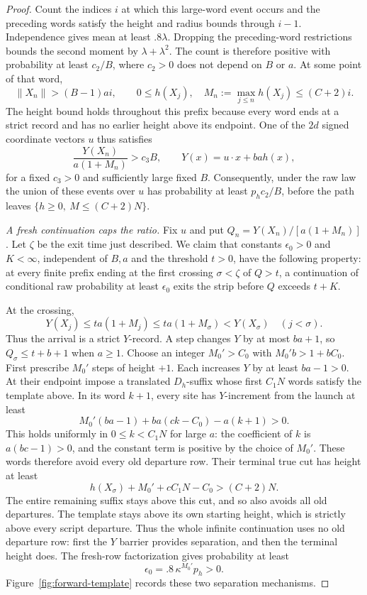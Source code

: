 \begin{proof}
Count the indices $i$ at which this large-word event occurs and the
preceding words satisfy the height and radius bounds through $i-1$.
Independence gives mean at least $.8\lambda$. Dropping the
preceding-word restrictions bounds the second moment by
$\lambda+\lambda^2$. The count is therefore positive with probability
at least $c_2/B$, where $c_2>0$ does not depend on $B$ or $a$.
At some point of that word,
\[
\|X_n\|>(B-1)ai,
\qquad 0\le h(X_j),\quad
M_n:=\max_{j\le n}h(X_j)\le(C+2)i.
\]
The height bound holds throughout this prefix because every word ends
at a strict record and has no earlier height above its endpoint.
One of the $2d$ signed coordinate vectors $u$ thus satisfies
\[
\frac{Y(X_n)}{a(1+M_n)}>c_3B,
\qquad Y(x)=u\cdot x+ba h(x),
\tag{3}\label{eq:3}
\]
for a fixed $c_3>0$ and sufficiently large fixed $B$.
Consequently, under the raw law the union of these events over $u$
has probability at least $p_hc_2/B$, before the path leaves
$\{h\ge0,\ M\le(C+2)N\}$.

\smallskip\noindent\emph{A fresh continuation caps the ratio.}
Fix $u$ and put $Q_n=Y(X_n)/[a(1+M_n)]$. Let $\zeta$ be the exit
time just described. We claim that constants $\epsilon_0>0$ and
$K<\infty$, independent of $B,a$ and the threshold $t>0$, have the
following property: at every finite prefix ending at the first crossing
$\sigma<\zeta$ of $Q>t$, a continuation of conditional raw probability
at least $\epsilon_0$ exits the strip before $Q$ exceeds $t+K$.

At the crossing,
\[
Y(X_j)\le ta(1+M_j)\le ta(1+M_\sigma)<Y(X_\sigma)
\quad(j<\sigma).
\]
Thus the arrival is a strict $Y$-record. A step changes $Y$ by at most
$ba+1$, so $Q_\sigma\le t+b+1$ when $a\ge1$.
Choose an integer $M_0'>C_0$ with
$M_0'b>1+bC_0$. First prescribe $M_0'$ steps of height $+1$.
Each increases $Y$ by at least $ba-1>0$. At their endpoint impose a
translated $D_h$-suffix whose first $C_1N$ words satisfy the template
above. In its word $k+1$, every site has $Y$-increment from the launch
at least
\[
M_0'(ba-1)+ba(ck-C_0)-a(k+1)>0.
\]
This holds uniformly in $0\le k<C_1N$ for large $a$: the coefficient
of $k$ is $a(bc-1)>0$, and the constant term is positive by the choice
of $M_0'$. These words therefore avoid every old departure row.
Their terminal true cut has height at least
\[
h(X_\sigma)+M_0'+cC_1N-C_0>(C+2)N.
\]
The entire remaining suffix stays above this cut, and so also avoids
all old departures. The template stays above its own starting height,
which is strictly above every script departure. Thus the whole infinite
continuation uses no old departure row: first the $Y$ barrier provides
separation, and then the terminal height does. The fresh-row
factorization gives probability at least
\[
\epsilon_0=.8\,\kappa^{M_0'}p_h>0.
\]
Figure~\ref{fig:forward-template} records these two separation mechanisms.


\end{proof}
